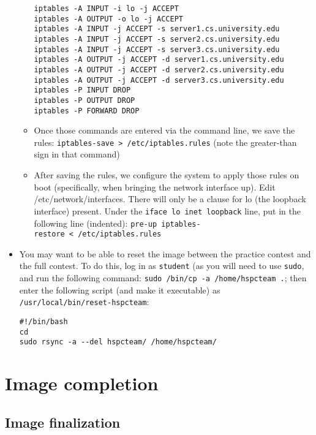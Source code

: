 \begin{itemize}
\begin{itemize}
\begin{verbatim}
iptables -A INPUT -i lo -j ACCEPT
iptables -A OUTPUT -o lo -j ACCEPT
iptables -A INPUT -j ACCEPT -s server1.cs.university.edu
iptables -A INPUT -j ACCEPT -s server2.cs.university.edu
iptables -A INPUT -j ACCEPT -s server3.cs.university.edu
iptables -A OUTPUT -j ACCEPT -d server1.cs.university.edu
iptables -A OUTPUT -j ACCEPT -d server2.cs.university.edu
iptables -A OUTPUT -j ACCEPT -d server3.cs.university.edu
iptables -P INPUT DROP
iptables -P OUTPUT DROP
iptables -P FORWARD DROP
\end{verbatim}
  \item
    Once those commands are entered via the command line, we save the
    rules: \texttt{iptables-save\ \textgreater{}\ /etc/iptables.rules}
    (note the greater-than sign in that command)
  \item
    After saving the rules, we configure the system to apply those rules
    on boot (specifically, when bringing the network interface up). Edit
    /etc/network/interfaces. There will only be a clause for lo (the
    loopback interface) present. Under the
    \texttt{iface\ lo\ inet\ loopback} line, put in the following line
    (indented):
    \texttt{pre-up\ iptables-restore\ \textless{}\ /etc/iptables.rules}
  \end{itemize}
\item You may want to be able to reset the image between the practice contest and the full contest.  To do this, log in as {\tt student} (as you will need to use {\tt sudo}, and run the following command:
    \texttt{sudo\ /bin/cp\ -a\ /home/hspcteam\ .}; then enter the
    following script (and make it executable) as
    \texttt{/usr/local/bin/reset-hspcteam}:

\begin{verbatim}
#!/bin/bash
cd
sudo rsync -a --del hspcteam/ /home/hspcteam/
\end{verbatim}

\end{itemize}

\section{Image completion}\label{image-completion}


\subsection*{Image finalization}

